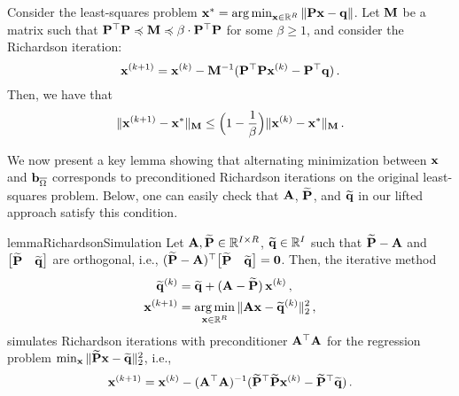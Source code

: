 \begin{lemma}
\label{lem:richardson_iteration}
Consider the least-squares problem $\mathbf{x}^* = \operatorname*{arg\,min}_{\mathbf{x} \in \mathbb{R}^R}\, \lVert\mathbf{P}\mathbf{x} - \mathbf{q}\rVert$.
Let $\mathbf{M}$ be a matrix such that $\mathbf{P}^\top \mathbf{P} \preccurlyeq \mathbf{M} \preccurlyeq \beta \cdot \mathbf{P}^\top \mathbf{P}$
for some $\beta \ge 1$,
and consider the Richardson iteration:
\[
    \mathbf{x}^{(k+1)} = \mathbf{x}^{(k)} - \mathbf{M}^{-1}(\mathbf{P}^\top \mathbf{P} \mathbf{x}^{(k)} - \mathbf{P}^\top \mathbf{q})\,.
\]
Then, we have that
\[
    \lVert\mathbf{x}^{(k+1)} - \mathbf{x}^*\rVert_{\mathbf{M}}
    \le
    \Bigl(1 - \frac{1}{\beta}\Bigr)
    \lVert\mathbf{x}^{(k)} - \mathbf{x}^*\rVert_{\mathbf{M}}\,.
\]
\end{lemma}

We now present a key lemma showing that alternating minimization between $\mathbf{x}$ and $\mathbf{b}_{\overline{\Omega}}$ corresponds to preconditioned Richardson iterations
on the original least-squares problem.
Below, one can easily check that $\mathbf{A}$, $\widetilde{\mathbf{P}}$, and $\widetilde{\mathbf{q}}$
in our lifted approach satisfy this condition.

\begin{restatable}{lemma}{RichardsonSimulation}
\label{lemma:richardson-simulation}
Let $\mathbf{A}, \widetilde{\mathbf{P}} \in \mathbb{R}^{I \times R}$, $\widetilde{\mathbf{q}}\in\mathbb{R}^{I}$ such that $\widetilde{\mathbf{P}}-\mathbf{A}$ and
$\bigl[\begin{matrix}
\widetilde{\mathbf{P}} & \widetilde{\mathbf{q}}
\end{matrix}\bigr]$
are orthogonal, i.e., $(\widetilde{\mathbf{P}}-\mathbf{A})^\top \bigl[\begin{matrix} \widetilde{\mathbf{P}} & \widetilde{\mathbf{q}} \end{matrix}\bigr] = \mathbf{0}$.
Then, the iterative method
\begin{align*}
    \widetilde{\mathbf{q}}^{(k)} & = \widetilde{\mathbf{q}} + (\mathbf{A} - \widetilde{\mathbf{P}})\, \mathbf{x}^{(k)}\,, \\
    \mathbf{x}^{(k+1)} & = \operatorname*{arg\,min}_{\mathbf{x} \in \mathbb{R}^{R}}\, \lVert\mathbf{A} \mathbf{x} - \widetilde{\mathbf{q}}^{(k)}\rVert_2^2\,,
\end{align*}
simulates Richardson iterations with preconditioner $\mathbf{A}^\top \mathbf{A}$
for the regression problem $\min_{\mathbf{x}}\, \lVert\widetilde{\mathbf{P}} \mathbf{x} - \widetilde{\mathbf{q}}\rVert_2^2$,
i.e.,
\begin{equation}
    \label{eq:update-rule}
    \mathbf{x}^{(k+1)}
    =
    \mathbf{x}^{(k)} - (\mathbf{A}^\top \mathbf{A})^{-1} (\widetilde{\mathbf{P}}^\top \widetilde{\mathbf{P}} \mathbf{x}^{(k)} - \widetilde{\mathbf{P}}^\top \widetilde{\mathbf{q}})\,.
\end{equation}
\end{restatable}

